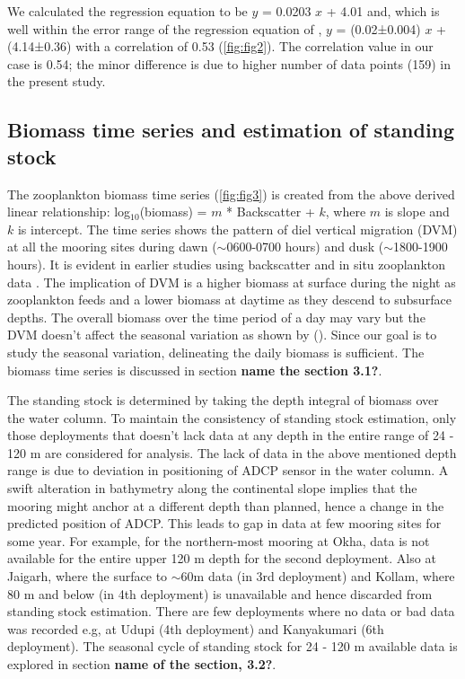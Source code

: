 \documentclass{article}
\begin{document}
	We calculated the regression equation to be $y$ = 0.0203 $x$  + 4.01 and, which is well within the error range of the regression equation of \citep{aparna2022seasonal}, $y$ = (0.02±0.004) $x$ + (4.14±0.36) with a correlation of 0.53 (\cref{fig:fig2}). The correlation value in our case is 0.54; the minor difference is  due to higher number of data points (159) in the present study. 
	
	\subsection{Biomass time series and estimation of standing stock}
	
	The zooplankton biomass time series (\cref{fig:fig3}) is created from the above derived linear relationship: log$_{10}$(biomass) = $m$ * Backscatter + $k$, where $m$ is slope and $k$ is intercept. The time series shows the pattern of diel vertical migration (DVM) at all the mooring sites during dawn ($\sim$0600-0700 hours) and dusk ($\sim$1800-1900 hours). It is evident in earlier studies using backscatter \citep{ashjian2002distribution,smith2005mesozooplankton,inoue2016diel,ursella2018evidence} and in situ zooplankton data \citep{padmavati1998vertical}. The implication of DVM is a higher biomass at surface during the night as zooplankton feeds and a lower biomass at daytime as they descend to subsurface depths. The overall biomass over the time period of a day may vary but the DVM doesn't affect the seasonal variation as shown by (\citep{jiang2007temporal,aparna2022seasonal}). Since our goal is to study the seasonal variation, delineating the daily biomass is sufficient. The biomass time series is discussed in section \textbf{name the section 3.1?}.
	
	The standing stock is determined by taking the depth integral of biomass over the water column. To maintain the consistency of standing stock estimation, only those deployments that doesn't lack data at any depth in the entire range of 24 - 120 m are considered for analysis. The lack of data in the above mentioned depth range is due to deviation in positioning of ADCP sensor in the water column. A swift alteration in bathymetry along the continental slope implies that the mooring might anchor at a different depth than planned, hence a change in the predicted position of ADCP. This leads to gap in data at few mooring sites for some year. For example, for the northern-most mooring at Okha, data is not available for the entire upper 120 m depth for the second deployment. Also at Jaigarh, where the surface to $\sim$60m data (in 3rd deployment) and Kollam, where 80 m and below (in 4th deployment) is unavailable and hence discarded from standing stock estimation. There are few deployments where no data or bad data was recorded e.g, at Udupi (4th deployment) and Kanyakumari (6th deployment). The seasonal cycle of standing stock for 24 - 120 m available data is explored in section \textbf{name of the section, 3.2?}.
	
\end{document}
